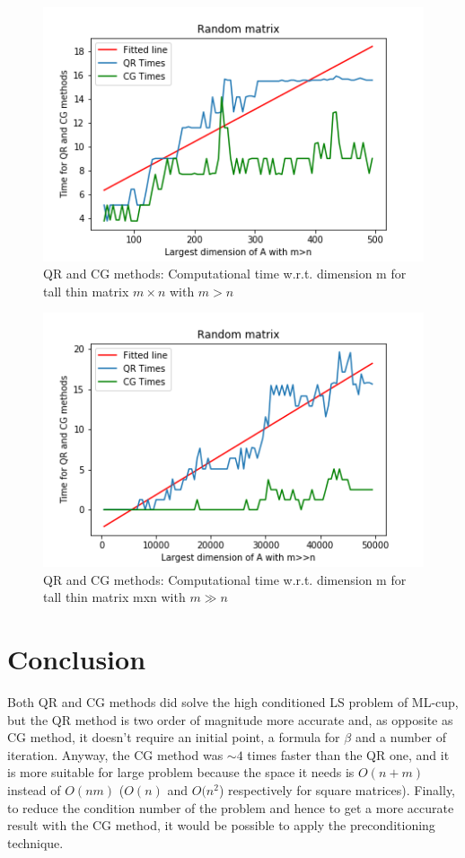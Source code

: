 \documentclass{article}
\begin{document}
        \begin{figure}
            \includegraphics[width=\linewidth]{../results/little_m.png}
            \caption{QR and CG methods: Computational time w.r.t. dimension m for tall thin matrix $m \times n$ with $m > n$}
            \label{little_m}
        \end{figure}
        \begin{figure}
            \includegraphics[width=\linewidth]{../results/big_m.png}
            \caption{QR and CG methods: Computational time w.r.t. dimension m for tall thin matrix mxn with $m \gg n$}
            \label{big_m}
        \end{figure}
	


\section{Conclusion}\label{sec:conclusion}
Both QR and CG methods did solve the high conditioned LS problem of ML-cup, but the QR method is two order of magnitude more accurate and, as opposite as CG method, it doesn't require an initial point, a formula for $\beta$ and a number of iteration.
Anyway, the CG method was $\sim 4$ times faster than the QR one, and it is more suitable for large problem because the space it needs is $O(n+m)$ instead of $O(nm)$ ($O(n)$ and $O(n^{2}$) respectively for square matrices). Finally, to reduce the condition number of the problem and hence to get a more accurate result with the CG method, it would be possible to apply the preconditioning technique. 



\end{document}
